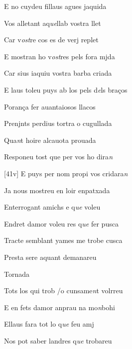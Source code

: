 \documentclass[12pt]{article}
\begin{document}
\begin{estrofa}

 E no cuydeu fillaus agues jaquida

 Vos alletant aq\textit{ue}llab vostra llet

 Car v\textit{ost}re cos es de verj replet

 E mostran ho v\textit{ost}res pels fora mjda

 Car sius iaquiu vostra barba criada

 E laus toleu puys ab los pels d\textit{e}ls bra\c{c}os

 Poran\c{c}a fer auantaiosos llacos

 Prenjnts perdius tortra o cugullada

\end{estrofa}



\begin{estrofa}

 Qua\textit{n}t hoire alcauota prouada

 Responeu tost que per vos ho dira\textit{n}

 [41v] E puys per nom propi vos cridara\textit{n}

 Ja nous mostreu en loir enpatxada

 Enterrogant  amichs e q\textit{ue} voleu

 Endret damor voleu res q\textit{ue} fer pusca

 Tracte semblant yames me trobe cusca

 Presta sere aquant demanareu

\end{estrofa}


\begin{estrofaExtra}%




\begin{tornada}

Tornada

\end{tornada}


\end{estrofaExtra}


\begin{estrofa}

 Tots los qui trob /o cunsame\textit{n}t volrreu

 E en fets damor anprau na mo\textit{n}bohi

 Ellaus fara tot lo q\textit{ue} feu amj

 Nos pot saber landres q\textit{ue} trobareu

\end{estrofa}
\end{document}
